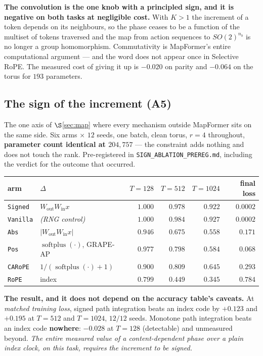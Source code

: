 \documentclass[11pt]{article}
\newcommand{\nb}{n_b}
\DeclareMathOperator{\softplus}{softplus}
\begin{document}
\textbf{The convolution is the one knob with a principled sign, and it is
negative on both tasks at negligible cost.} With $K>1$ the increment of a token
depends on its neighbours, so the phase ceases to be a function of the multiset of
tokens traversed and the map from action sequences to $SO(2)^{\nb}$ is no longer a
group homomorphism. Commutativity is MapFormer's entire computational argument ---
and the word does not appear once in Selective RoPE. The measured cost of giving it
up is $-0.020$ on parity and $-0.064$ on the torus for $193$ parameters.

\subsection{The sign of the increment (A5)}
\label{sec:sign}

The one axis of $\S$\ref{sec:map} where every mechanism outside MapFormer sits on
the same side. Six arms $\times$ $12$ seeds, one batch, clean torus, $r=4$
throughout, \textbf{parameter count identical at $204{,}757$} --- the constraint
adds nothing and does not touch the rank. Pre-registered in
\texttt{SIGN\_ABLATION\_PREREG.md}, including the verdict for the outcome that
occurred.

\begin{center}\small
\begin{tabular}{llrrrr}
\toprule
arm & $\Delta$ & $T{=}128$ & $T{=}512$ & $T{=}1024$ & final loss \\
\midrule
\texttt{Signed}  & $W_{\mathrm{out}}W_{\mathrm{in}}x$ & $1.000$ & $0.978$ & $0.922$ & $0.0002$ \\
\texttt{Vanilla} & \emph{(RNG control)}               & $1.000$ & $0.984$ & $0.927$ & $0.0002$ \\
\midrule
\texttt{Abs}     & $|W_{\mathrm{out}}W_{\mathrm{in}}x|$ & $0.946$ & $0.675$ & $0.558$ & $0.171$ \\
\texttt{Pos}     & $\softplus(\cdot)$, GRAPE-AP        & $0.977$ & $0.798$ & $0.584$ & $0.068$ \\
\texttt{CARoPE}  & $1/(\softplus(\cdot)+1)$            & $0.900$ & $0.809$ & $0.645$ & $0.293$ \\
\midrule
\texttt{RoPE}    & index                               & $0.799$ & $0.449$ & $0.345$ & $0.784$ \\
\bottomrule
\end{tabular}
\end{center}

\noindent\textbf{The result, and it does not depend on the accuracy table's
caveats.} At \emph{matched training loss}, signed path integration beats an index
code by $+0.123$ and $+0.195$ at $T=512$ and $T=1024$, $12/12$ seeds. Monotone path
integration beats an index code \textbf{nowhere}: $-0.028$ at $T=128$ (detectable)
and unmeasured beyond. \emph{The entire measured value of a content-dependent phase
over a plain index clock, on this task, requires the increment to be signed.}
\end{document}
